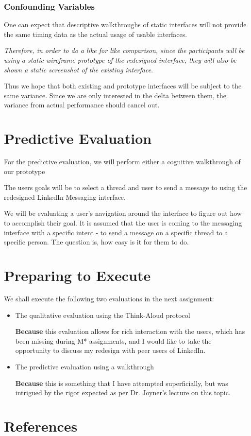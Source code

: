 \documentclass[
	letterpaper, %
]{jdf}
\begin{document}
\subsubsection{Confounding Variables}
One can expect that descriptive walkthroughs of static interfaces will not provide the same timing data as the actual usage of usable interfaces. 

\textit{Therefore, in order to do a like for like comparison, since the participants will be using a static wireframe prototype of the redesigned interface, they will also be shown a static screenshot of the existing interface}.

Thus we hope that both existing and prototype interfaces will be subject to the same variance. Since we are only interested in the delta between them, the variance from actual performance should cancel out.

\section{Predictive Evaluation}
For the predictive evaluation, we will perform either a cognitive walkthrough of our prototype

The users goals will be to select a thread and user to send a message to using the redesigned LinkedIn Messaging interface.

We will be evaluating a user’s navigation around the interface to figure out how to accomplish their goal. It is assumed that the user is coming to the messaging interface with a specific intent - to send a message on a specific thread to a specific person. The question is, how easy is it for them to do.


\section{Preparing to Execute}
We shall execute the following two evaluations in the next assignment:
\begin{itemize}
    \item The qualitative evaluation using the Think-Aloud protocol
    
    \textbf{Because} this evaluation allows for rich interaction with the users, which has been missing during M* assignments, and I would like to take the opportunity to discuss my redesign with peer users of LinkedIn.
    \item The predictive evaluation using a walkthrough
    
    \textbf{Because} this is something that I have attempted superficially, but was intrigued by the rigor expected as per Dr. Joyner's lecture on this topic.
\end{itemize}





\section{References}

\printbibliography[heading=none]
\end{document}
